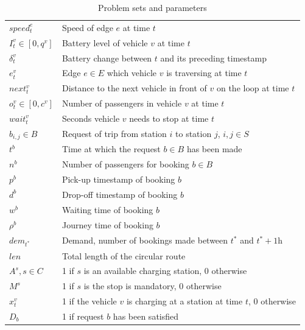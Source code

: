 \documentclass[12pt,a4paper]{article}
\begin{document}
\begin{table}
{\begin{tabular}{| l | l |}
  $speed^{e}_{t}$ & Speed of edge $e$ at time $t$ \\
  $I^{v}_{t} \in [0, q^{v}]$ & Battery level of vehicle $v$ at time $t$ \\  
  $\delta^{v}_{t}$ & Battery change between $t$ and its preceding timestamp \\  
  $e^{v}_{t}$ & Edge $e \in E$ which vehicle $v$ is traversing at time $t$ \\
  $next^{v}_{t}$ &  Distance to the next vehicle in front of $v$ on the loop at time $t$ \\
  $o^{v}_{t} \in [0, c^{v}]$ & Number of passengers in vehicle $v$ at time $t$ \\
  $wait^{v}_{t}$ & Seconds vehicle $v$ needs to stop at time $t$ \\  
  
  $b_{i,j} \in B$ & Request of trip from station $i$ to station $j$, $i,j \in S$ \\
  $t^{b}$ & Time at which the request $b \in B$ has been made \\
  $n^{b}$ & Number of passengers for booking $b \in B$ \\
  $p^{b}$ & Pick-up timestamp of booking $b$ \\
  $d^{b}$ & Drop-off timestamp of booking $b$ \\
  $w^{b}$ & Waiting time of booking $b$ \\
  $\rho^{b}$ & Journey time of booking $b$ \\
  $dem_{t^{*}}$ & Demand, number of bookings made between $t^{*}$ and $t^{*} + 1\text{h}$\\
  $len$ & Total length of the circular route \\

  $A^{s}, s \in C$ & 1 if $s$ is an available charging station, 0 otherwise \\
  $M^{s}$ & 1 if $s$ is the stop is mandatory, 0 otherwise \\
  $x^{v}_{t}$ & 1 if the vehicle $v$ is charging at a station at time $t$, 0 otherwise \\
  $D_{b}$ & 1 if request $b$ has been satisfied \\
  \hline  
\end{tabular}
}
\caption{Problem sets and parameters}
\label{table:parameters}
\end{table}
\end{document}
